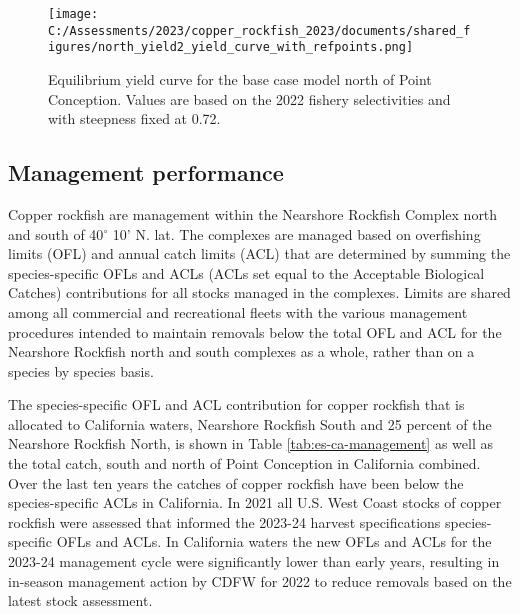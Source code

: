 \documentclass[11pt,
  english,
  letterpaper,
]{article}
\begin{document}
\begin{figure}
\centering
\texttt{[image: C:/Assessments/2023/copper\_rockfish\_2023/documents/shared\_figures/north\_yield2\_yield\_curve\_with\_refpoints.png]}
\caption{Equilibrium yield curve for the base case model north of Point Conception. Values are based on the 2022 fishery selectivities and with steepness fixed at 0.72.\label{fig:es-yield-north}}
\end{figure}

\pagebreak

\hypertarget{management-performance}{%
\subsection*{Management performance}\label{management-performance}}

Copper rockfish are management within the Nearshore Rockfish Complex north and south of 40\(^\circ\) 10' N. lat. The complexes are managed based on overfishing limits (OFL) and annual catch limits (ACL) that are determined by summing the species-specific OFLs and ACLs (ACLs set equal to the Acceptable Biological Catches) contributions for all stocks managed in the complexes. Limits are shared among all commercial and recreational fleets with the various management procedures intended to maintain removals below the total OFL and ACL for the Nearshore Rockfish north and south complexes as a whole, rather than on a species by species basis.

The species-specific OFL and ACL contribution for copper rockfish that is allocated to California waters, Nearshore Rockfish South and 25 percent of the Nearshore Rockfish North, is shown in Table \ref{tab:es-ca-management} as well as the total catch, south and north of Point Conception in California combined. Over the last ten years the catches of copper rockfish have been below the species-specific ACLs in California. In 2021 all U.S. West Coast stocks of copper rockfish were assessed that informed the 2023-24 harvest specifications species-specific OFLs and ACLs. In California waters the new OFLs and ACLs for the 2023-24 management cycle were significantly lower than early years, resulting in in-season management action by CDFW for 2022 to reduce removals based on the latest stock assessment.

\begingroup\fontsize{10}{12}\selectfont
\begingroup\fontsize{10}{12}\selectfont
\end{document}

